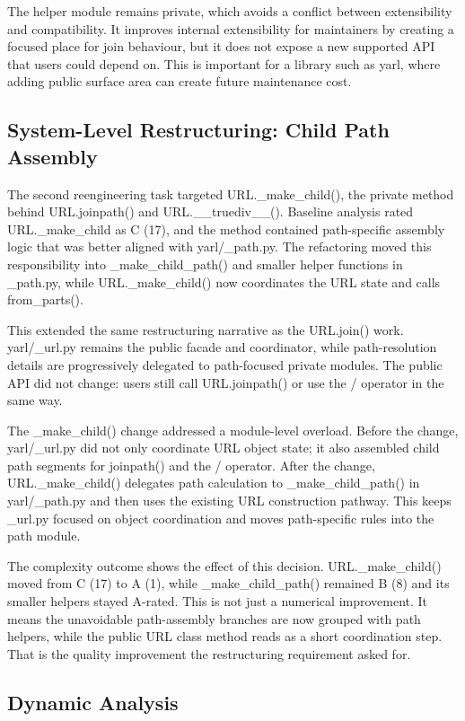 \documentclass[11pt,a4paper]{article}
\begin{document}
The helper module remains private, which avoids a conflict between extensibility and compatibility. It improves internal extensibility for maintainers by creating a focused place for join behaviour, but it does not expose a new supported API that users could depend on. This is important for a library such as yarl, where adding public surface area can create future maintenance cost.


\subsection*{System-Level Restructuring: Child Path Assembly}


The second reengineering task targeted URL.\_make\_child(), the private method behind URL.joinpath() and URL.\_\_truediv\_\_(). Baseline analysis rated URL.\_make\_child as C (17), and the method contained path-specific assembly logic that was better aligned with yarl/\_path.py. The refactoring moved this responsibility into \_make\_child\_path() and smaller helper functions in \_path.py, while URL.\_make\_child() now coordinates the URL state and calls from\_parts().


This extended the same restructuring narrative as the URL.join() work. yarl/\_url.py remains the public facade and coordinator, while path-resolution details are progressively delegated to path-focused private modules. The public API did not change: users still call URL.joinpath() or use the / operator in the same way.


The \_make\_child() change addressed a module-level overload. Before the change, yarl/\_url.py did not only coordinate URL object state; it also assembled child path segments for joinpath() and the / operator. After the change, URL.\_make\_child() delegates path calculation to \_make\_child\_path() in yarl/\_path.py and then uses the existing URL construction pathway. This keeps \_url.py focused on object coordination and moves path-specific rules into the path module.


The complexity outcome shows the effect of this decision. URL.\_make\_child() moved from C (17) to A (1), while \_make\_child\_path() remained B (8) and its smaller helpers stayed A-rated. This is not just a numerical improvement. It means the unavoidable path-assembly branches are now grouped with path helpers, while the public URL class method reads as a short coordination step. That is the quality improvement the restructuring requirement asked for.


\subsection*{Dynamic Analysis}
\end{document}
